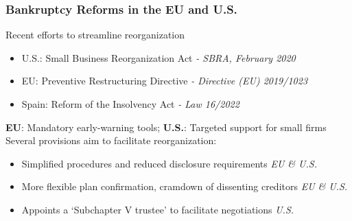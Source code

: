 \documentclass[aspectratio=169,xcolor=table]{beamer}
\begin{document}
\begin{frame}[label=EUandUS]  \frametitle{Bankruptcy Reforms in the EU and U.S. \hfill \hyperlink{sbra_emp}{} \hyperlink{SBRA}{}  }

Recent efforts to streamline reorganization
\begin{itemize} \small
    \item U.S.: Small Business Reorganization Act \hspace{11mm }\textit{- SBRA, February 2020} 
    \item EU: Preventive Restructuring Directive \hspace{12.32mm} \textit{- Directive (EU) 2019/1023}
    \item Spain: Reform of the Insolvency Act \hspace{16mm} \textit{- Law 16/2022}

\end{itemize} \normalsize 
\textbf{EU}: Mandatory early-warning tools; \quad \textbf{U.S.}: Targeted support for small firms  \vspace{5mm} \\

Several provisions aim to facilitate reorganization:
\begin{itemize} \small
    \item Simplified procedures and reduced disclosure requirements \hfill \textit{EU \& U.S.}
    \item More flexible plan confirmation, cramdown of dissenting creditors \hfill \textit{EU \& U.S.}
    \item Appoints a `Subchapter V trustee' to facilitate negotiations \hfill \textit{U.S.} 
\end{itemize} \normalsize

\end{frame}
\end{document}
